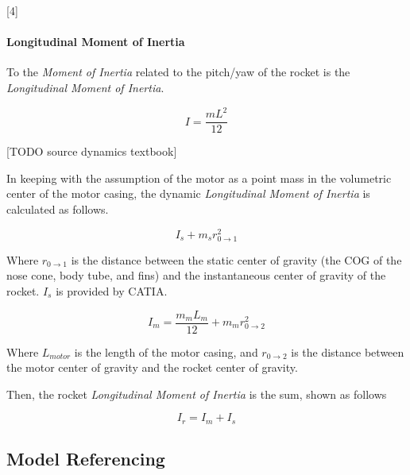 \documentclass[]{article}
\let\oldparagraph\paragraph
\renewcommand{\paragraph}[1]{\oldparagraph{#1}\mbox{}}
\begin{document}
{[}4{]}

\paragraph{Longitudinal Moment of
Inertia}\label{longitudinal-moment-of-inertia}

To the \emph{Moment of Inertia} related to the pitch/yaw of the rocket
is the \emph{Longitudinal Moment of Inertia}.

\begin{equation}
\label{longitudinal_moment_inertia}
I = \dfrac{mL^2}{12}
\end{equation}

{[}TODO source dynamics textbook{]}

In keeping with the assumption of the motor as a point mass in the
volumetric center of the motor casing, the dynamic \emph{Longitudinal
Moment of Inertia} is calculated as follows.

\begin{equation}
\label{static_longitudinal_moment_inertia}
I_{s} + m_{s} r_{0 \rightarrow 1}^2
\end{equation}

Where \(r_{0 \rightarrow 1}\) is the distance between the static center
of gravity (the COG of the nose cone, body tube, and fins) and the
instantaneous center of gravity of the rocket. \(I_{s}\) is provided by
CATIA.

\begin{equation}
\label{motor_longitudinal_moment_inertia}
I_{m} = \dfrac{m_{m}L_{m}}{12} + m_{m}r_{0 \rightarrow 2}^2
\end{equation}

Where \(L_{motor}\) is the length of the motor casing, and
\(r_{0 \rightarrow 2}\) is the distance between the motor center of
gravity and the rocket center of gravity.

Then, the rocket \emph{Longitudinal Moment of Inertia} is the sum, shown
as follows

\begin{equation}
\label{rocket_longitudinal_moment_inertia}
I_{r} = I_{m} + I_{s}
\end{equation}

\clearpage

\subsection{Model Referencing}\label{model-referencing}
\end{document}

